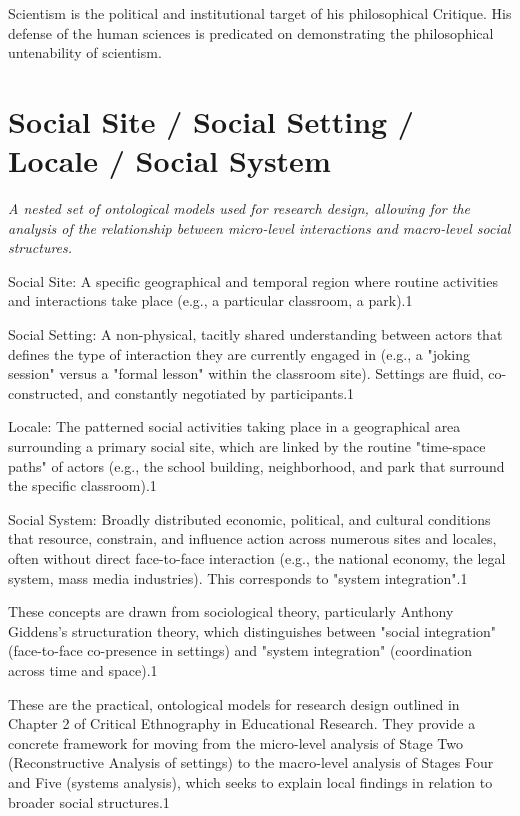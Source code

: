\documentclass{book}
\begin{document}
Scientism is the political and institutional target of his philosophical Critique. His defense of the human sciences is predicated on demonstrating the philosophical untenability of scientism.

\parencite{Carspecken2016}


\section{Social Site / Social Setting / Locale / Social System}

\textit{A nested set of ontological models used for research design, allowing for the analysis of the relationship between micro-level interactions and macro-level social structures.} 

Social Site: A specific geographical and temporal region where routine activities and interactions take place (e.g., a particular classroom, a park).1

Social Setting: A non-physical, tacitly shared understanding between actors that defines the type of interaction they are currently engaged in (e.g., a "joking session" versus a "formal lesson" within the classroom site). Settings are fluid, co-constructed, and constantly negotiated by participants.1

Locale: The patterned social activities taking place in a geographical area surrounding a primary social site, which are linked by the routine "time-space paths" of actors (e.g., the school building, neighborhood, and park that surround the specific classroom).1

Social System: Broadly distributed economic, political, and cultural conditions that resource, constrain, and influence action across numerous sites and locales, often without direct face-to-face interaction (e.g., the national economy, the legal system, mass media industries). This corresponds to "system integration".1

These concepts are drawn from sociological theory, particularly Anthony Giddens's structuration theory, which distinguishes between "social integration" (face-to-face co-presence in settings) and "system integration" (coordination across time and space).1

These are the practical, ontological models for research design outlined in Chapter 2 of Critical Ethnography in Educational Research. They provide a concrete framework for moving from the micro-level analysis of Stage Two (Reconstructive Analysis of settings) to the macro-level analysis of Stages Four and Five (systems analysis), which seeks to explain local findings in relation to broader social structures.1
\end{document}
